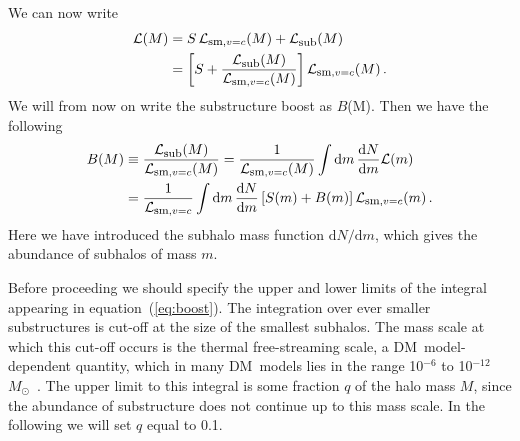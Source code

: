 \documentclass[aps,prd,twocolumn,amsmath,amssymb,floatfix,nofootinbib,10pt]{revtex4}
\newcommand{\DM}{DM}
\newcommand{\somm}{\ensuremath{S}}
\newcommand{\dd}{\mathrm{d}}
\newcommand{\eqnname}{equation}
\newcommand{\lum}{\ensuremath{\mathcal{L}}}
\newcommand{\lumsmoothc}{\ensuremath{\lum_{\mbox{{\footnotesize sm}},v=c}}}
\newcommand{\lumsub}{\ensuremath{\lum_{\mbox{{\footnotesize sub}}}}}
\newcommand{\boost}{\ensuremath{B}}
\newcommand{\Msol}{\ensuremath{M_{\odot}}}
\begin{document}
We can now write
\begin{equation}\label{eq:totboost}
\begin{split}
\lum(M) & = \somm\,\lumsmoothc(M) + \lumsub(M)\\
&= \left[ \somm + \frac{\lumsub(M)}{\lumsmoothc(M)}\right] \lumsmoothc(M)\, .
\end{split}
\end{equation}
We will from now on write the substructure boost as \boost(M). Then we
have the following
\begin{equation}\label{eq:boost}
\begin{split}
\boost(M) & \equiv \frac{\lumsub(M)}{\lumsmoothc(M)} = \frac{1}{\lumsmoothc(M)} \int \dd m \, \frac{\dd N}{\dd m} \lum(m)\\
&= \frac{1}{\lumsmoothc} \int \dd m\, \frac{\dd N}{\dd m} \left[ \somm(m) + \boost(m) \right] \lumsmoothc(m)\, .
\end{split}
\end{equation}
Here we have introduced the subhalo mass function $\dd N/\dd m$, which
gives the abundance of subhalos of mass $m$.

Before proceeding we should specify the upper and lower limits of the
integral appearing in \eqnname\ (\ref{eq:boost}). The integration over
ever smaller substructures is cut-off at the size of the smallest
subhalos. The mass scale at which this cut-off occurs is the thermal
free-streaming scale, a \DM\ model-dependent quantity, which in many
\DM\ models lies in the range 10$^{-6}$ to 10$^{-12}$ \Msol\
\cite{1999PhRvD..59d3517S,2001PhRvD..64h3507H,2004MNRAS.353L..23G,2005PhRvD..71j3520L,2006PhRvL..97c1301P}. The
upper limit to this integral is some fraction $q$ of the halo mass
$M$, since the abundance of substructure does not continue up to this
mass scale. In the following we will set $q$ equal to 0.1.
\end{document}
